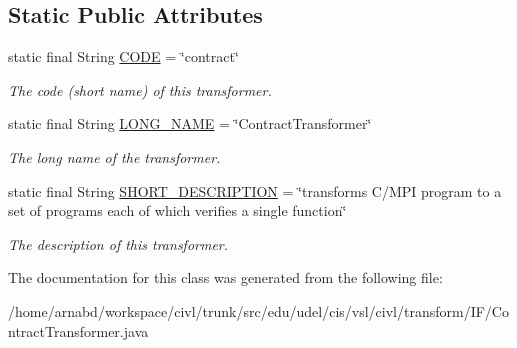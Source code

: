 \subsection*{Static Public Attributes}
\begin{DoxyCompactItemize}
\item 
\hypertarget{classedu_1_1udel_1_1cis_1_1vsl_1_1civl_1_1transform_1_1IF_1_1ContractTransformer_a6bccadd3e4f564dcd54d7e649483911f}{}static final String \hyperlink{classedu_1_1udel_1_1cis_1_1vsl_1_1civl_1_1transform_1_1IF_1_1ContractTransformer_a6bccadd3e4f564dcd54d7e649483911f}{C\+O\+D\+E} = \char`\"{}contract\char`\"{}\label{classedu_1_1udel_1_1cis_1_1vsl_1_1civl_1_1transform_1_1IF_1_1ContractTransformer_a6bccadd3e4f564dcd54d7e649483911f}

\begin{DoxyCompactList}\small\item\em The code (short name) of this transformer. \end{DoxyCompactList}\item 
\hypertarget{classedu_1_1udel_1_1cis_1_1vsl_1_1civl_1_1transform_1_1IF_1_1ContractTransformer_a2dea16cd7693e0586d391d36f70fc6a8}{}static final String \hyperlink{classedu_1_1udel_1_1cis_1_1vsl_1_1civl_1_1transform_1_1IF_1_1ContractTransformer_a2dea16cd7693e0586d391d36f70fc6a8}{L\+O\+N\+G\+\_\+\+N\+A\+M\+E} = \char`\"{}Contract\+Transformer\char`\"{}\label{classedu_1_1udel_1_1cis_1_1vsl_1_1civl_1_1transform_1_1IF_1_1ContractTransformer_a2dea16cd7693e0586d391d36f70fc6a8}

\begin{DoxyCompactList}\small\item\em The long name of the transformer. \end{DoxyCompactList}\item 
\hypertarget{classedu_1_1udel_1_1cis_1_1vsl_1_1civl_1_1transform_1_1IF_1_1ContractTransformer_a2e4eaa1e6d738b07a4fd19082de6bda8}{}static final String \hyperlink{classedu_1_1udel_1_1cis_1_1vsl_1_1civl_1_1transform_1_1IF_1_1ContractTransformer_a2e4eaa1e6d738b07a4fd19082de6bda8}{S\+H\+O\+R\+T\+\_\+\+D\+E\+S\+C\+R\+I\+P\+T\+I\+O\+N} = \char`\"{}transforms C/M\+P\+I program to a set of programs each of which verifies a single function\char`\"{}\label{classedu_1_1udel_1_1cis_1_1vsl_1_1civl_1_1transform_1_1IF_1_1ContractTransformer_a2e4eaa1e6d738b07a4fd19082de6bda8}

\begin{DoxyCompactList}\small\item\em The description of this transformer. \end{DoxyCompactList}\end{DoxyCompactItemize}


The documentation for this class was generated from the following file\+:\begin{DoxyCompactItemize}
\item 
/home/arnabd/workspace/civl/trunk/src/edu/udel/cis/vsl/civl/transform/\+I\+F/Contract\+Transformer.\+java\end{DoxyCompactItemize}
